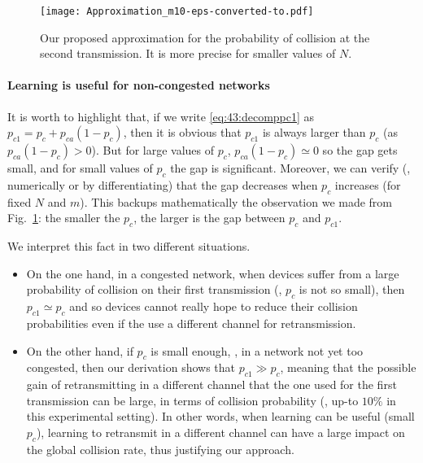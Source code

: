 \begin{figure}[htp!]  %
	\centering
	\texttt{[image: Approximation\_m10-eps-converted-to.pdf]}
	\caption{Our proposed approximation for the probability of collision at the second transmission. It is more precise for smaller values of $N$.}
	\label{fig:43:Approximation_m10}
\end{figure}


\paragraph{Learning is useful for non-congested networks}

It is worth to highlight that, if we write \eqref{eq:43:decomppc1} as $p_{c1} = p_c + p_{ca} \left(1-p_c\right)$,
then it is obvious that $p_{c1}$ is always larger than $p_c$ (as $p_{ca} \left(1-p_c\right) > 0$).
But for large values of $p_c$, $p_{ca}\left(1-p_c\right) \simeq 0$ so the gap gets small,
and for small values of $p_c$ the gap is significant.
Moreover, we can verify (\eg, numerically or by differentiating)
that the gap decreases when $p_c$ increases (for fixed $N$ and $m$).
This backups mathematically the observation we made from Fig.~\ref{fig:43:Approximation_m10}:
the smaller the $p_c$, the larger is the gap between $p_c$ and $p_{c1}$.

We interpret this fact in two different situations.
\begin{itemize}
	\item
	On the one hand, in a congested network, when devices suffer from a large probability of collision on their first transmission (\ie, $p_c$ is not so small), then $p_{c1}\simeq p_c$ and so devices cannot really hope to reduce their collision probabilities even if the use a different channel for retransmission.
	\item
	On the other hand, if $p_c$ is small enough, \ie, in a network not yet too congested, then our derivation shows that $p_{c1} \gg p_c$, meaning that the possible gain of retransmitting in a different channel that the one used for the first transmission can be large, in terms of collision probability (\eg, up-to $10\%$ in this experimental setting).
	In other words, when learning can be useful (small $p_c$), learning to retransmit in a different channel can have a large impact on the global collision rate,
	thus justifying our approach.
\end{itemize}



